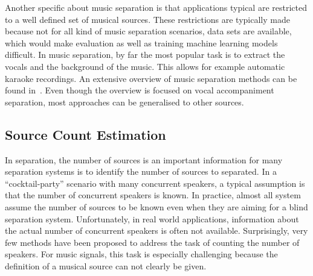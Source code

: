 Another specific about music separation is that applications typical are restricted to a well defined set of musical sources.
These restrictions are typically made because not for all kind of music separation scenarios, data sets are available, which would make evaluation as well as training machine learning models difficult.
In music separation, by far the most popular task is to extract the vocals and the background of the music.
This allows for example automatic karaoke recordings.
An extensive overview of music separation methods can be found in~\cite{rafii18}.
Even though the overview is focused on vocal accompaniment separation, most approaches can be generalised to other sources.

\subsection{Source Count Estimation}

In separation, the number of sources is an important information for many separation systems is to identify the number of sources to separated.
In a “cocktail-party” scenario with many concurrent speakers, a typical assumption is that the number of concurrent speakers is known.
In practice, almost all system assume the number of sources to be known even when they are aiming for a blind separation system.
Unfortunately, in real world applications, information about the actual number of concurrent speakers
is often not available.
Surprisingly, very few methods have been proposed to address the task of
counting the number of speakers.
For music signals, this task is especially challenging because the definition of a musical source can not clearly be given.
